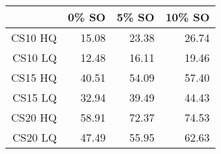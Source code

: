 \begin{table}[ht]
\begin{center}
\begin{tabular}{rrrr}
  \hline
& 0\% SO & 5\% SO & 10\% SO \\
\hline
CS10 HQ &15.08 & 23.38 & 26.74 \\
  CS10 LQ & 12.48 & 16.11 & 19.46 \\
  CS15 HQ & 40.51 & 54.09 & 57.40 \\
  CS15 LQ & 32.94 & 39.49 & 44.43 \\
  CS20 HQ & 58.91 & 72.37 & 74.53 \\
  CS20 LQ & 47.49 & 55.95 & 62.63 \\
   \hline
\end{tabular}
\end{center}
\end{table}
